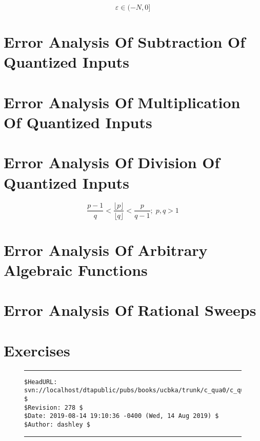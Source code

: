 \begin{equation}
\label{eq:cqua0:eaqi:005}
\varepsilon \in (-N,0]
\end{equation}

\section{Error Analysis Of Subtraction Of Quantized Inputs}

\section{Error Analysis Of Multiplication Of Quantized Inputs}

\section{Error Analysis Of Division Of Quantized Inputs}

\begin{equation}
\frac{p-1}{q}
<
\frac{\lfloor p \rfloor}{\lfloor q \rfloor}
<
\frac{p}{q-1}; \; p,q > 1
\end{equation}

\section{Error Analysis Of Arbitrary Algebraic Functions}

\section{Error Analysis Of Rational Sweeps}

\section{Exercises}



\noindent\begin{figure}[!b]
\noindent\rule[-0.25in]{\textwidth}{1pt}
\begin{tiny}
\begin{verbatim}
$HeadURL: svn://localhost/dtapublic/pubs/books/ucbka/trunk/c_qua0/c_qua0.tex $
$Revision: 278 $
$Date: 2019-08-14 19:10:36 -0400 (Wed, 14 Aug 2019) $
$Author: dashley $
\end{verbatim}
\end{tiny}
\noindent\rule[0.25in]{\textwidth}{1pt}
\end{figure}

%
